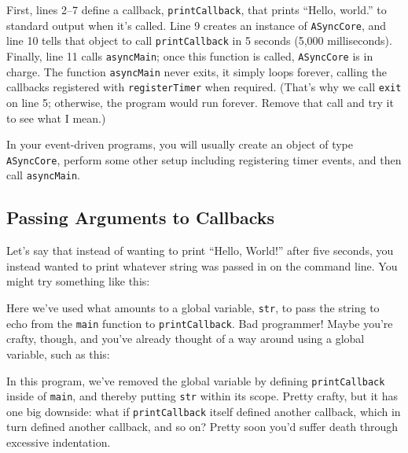 \documentclass[11pt]{article}
\begin{document}
First, lines 2--7 define a callback, \texttt{printCallback}, that prints
``Hello, world.'' to standard output when it's called.  Line 9 creates
an instance of \texttt{ASyncCore}, and line 10 tells that object to call
\texttt{printCallback} in 5 seconds (5,000 milliseconds).  Finally, line
11 calls \texttt{asyncMain}; once this function is called,
\texttt{ASyncCore} is in charge.  The function \texttt{asyncMain} never
exits, it simply loops forever, calling the callbacks registered with
\texttt{registerTimer} when required.  (That's why we call \texttt{exit}
on line 5; otherwise, the program would run forever.  Remove that call
and try it to see what I mean.)

In your event-driven programs, you will usually create an object of type
\texttt{ASyncCore}, perform some other setup including registering timer
events, and then call \texttt{asyncMain}.  

\subsection{Passing Arguments to Callbacks}

Let's say that instead of wanting to print ``Hello, World!'' after five
seconds, you instead wanted to print whatever string was passed in on the
command line.  You might try something like this:

\begin{quote}
\lstset{language=Java, basicstyle=\small, numbers=left, numberstyle=\tiny, 
        numberfirstline=true, stepnumber=1, numbersep=5pt}

\end{quote}

Here we've used what amounts to a global variable, \texttt{str}, to pass the
string to echo from the \texttt{main} function to \texttt{printCallback}.  Bad
programmer!  Maybe you're crafty, though, and you've already thought of a way
around using a global variable, such as this:

\begin{quote}
\lstset{language=Java, basicstyle=\small, numbers=left, numberstyle=\tiny, 
        numberfirstline=true, stepnumber=1, numbersep=5pt}

\end{quote}

In this program, we've removed the global variable by defining
\texttt{printCallback} inside of \texttt{main}, and thereby putting
\texttt{str} within its scope.  Pretty crafty, but it has one
big downside: what if \texttt{printCallback} itself defined another
callback, which in turn defined another callback, and so on?
Pretty soon you'd suffer death through excessive indentation.  
\end{document}
